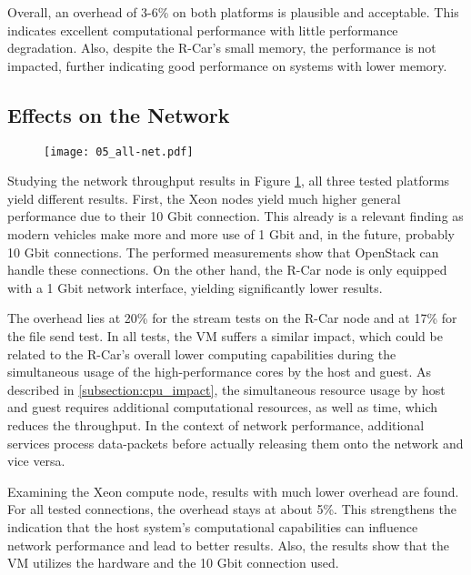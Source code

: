             \noindent Overall, an overhead of 3-6\% on both platforms is plausible and acceptable. 
            This indicates excellent computational performance with little performance degradation. 
            Also, despite the R-Car's small memory, the performance is not impacted, further indicating good performance on systems with lower memory. 


        \subsection{Effects on the Network}
        \label{subsection:network_impact}
            
            \begin{figure}[ht]
              \centering
              \texttt{[image: 05\_all-net.pdf]}
              \label{fig:all_net}
            \end{figure}
            
            \noindent Studying the network throughput results in Figure \ref{fig:all_net}, all three tested platforms yield different results.
            First, the Xeon nodes yield much higher general performance due to their 10 Gbit connection.
            This already is a relevant finding as modern vehicles make more and more use of 1 Gbit and, in the future, probably 10 Gbit connections.
            The performed measurements show that OpenStack can handle these connections.
            On the other hand, the R-Car node is only equipped with a 1 Gbit network interface, yielding significantly lower results.
            
            \noindent The overhead lies at 20\% for the stream tests on the R-Car node and at 17\% for the file send test. 
            In all tests, the VM suffers a similar impact, which could be related to the R-Car's overall lower computing capabilities during the simultaneous usage of the high-performance cores by the host and guest.
            As described in \ref{subsection:cpu_impact}, the simultaneous resource usage by host and guest requires additional computational resources, as well as time, which reduces the throughput.
            In the context of network performance, additional services process data-packets before actually releasing them onto the network and vice versa.
            
            \noindent Examining the Xeon compute node, results with much lower overhead are found.
            For all tested connections, the overhead stays at about 5\%.
            This strengthens the indication that the host system's computational capabilities can influence network performance and lead to better results.
            Also, the results show that the VM utilizes the hardware and the 10 Gbit connection used. 
            
